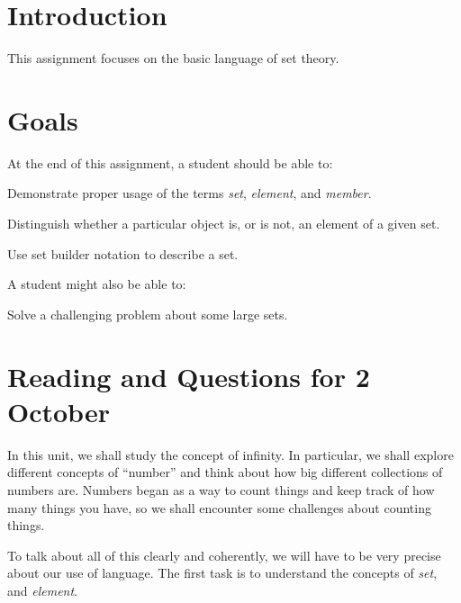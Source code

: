 \documentclass[12pt,letterpaper]{article}
\theoremstyle{definition}
\begin{document}
\setlength{\parskip}{1ex plus 0.5ex minus 0.2ex}
\setlength{\parindent}{0pt}

\pagestyle{fancy}
\cfoot{}

\section*{Introduction}
This assignment focuses on the basic language of set theory.

\section*{Goals}
At the end of this assignment, a student should be able to:
\begin{compactitem}
\item Demonstrate proper usage of the terms \emph{set}, \emph{element}, and \emph{member}.
\item Distinguish whether a particular object is, or is not, an element of a given set.
\item Use set builder notation to describe a set.
\end{compactitem}
A student might also be able to:
\begin{compactitem}
\item Solve a challenging problem about some large sets.
\end{compactitem}

\section*{Reading and Questions for 2 October}

In this unit, we shall study the concept of infinity. 
In particular, we shall explore different concepts of ``number'' and think about how big different collections of numbers are. 
Numbers began as a way to count things and keep track of how many things you have, so we shall encounter some challenges about counting things.

To talk about all of this clearly and coherently, we will have to be very precise about our use of language.
The first task is to understand the concepts of \emph{set}, and \emph{element}.
\end{document}
